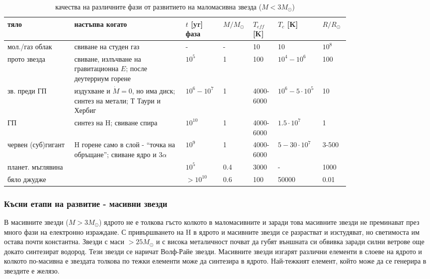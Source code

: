 \documentclass[a4paper,12pt]{article}
\begin{document}
\begin{table}[]
\begin{tabular}{p{0.18\linewidth}|p{0.30\linewidth}|p{0.08\linewidth}|p{0.06\linewidth}|p{0.06\linewidth}|p{0.06\linewidth}|p{0.06\linewidth}}
тяло               & настъпва когато                                                          & $t$ [yr]     фаза & $M/M_\odot$ & $T_{eff}$ [K]     & $T_c$ [K]           & $R/R_\odot$  \\
\hline
\hline
мол./газ облак     & свиване на студен газ                                                    & -                 & -           & 10                & 10                  & $10^8$       \\
\hline
прото звезда       & свиване, излъчване на гравитационна $E$; после деутерриум горене         & $10^5$            & 1           & 100               & $10^4-10^6$         & 100          \\
\hline
зв. преди ГП       & издухване и $\dot{M}=0$, но има диск; синтез на метали; Т Таури и Хербиг & $10^6 - 10^7$     & 1           & 4000-6000         & $10^6-5 \cdot 10^5$ & 10           \\
\hline
ГП                 & синтез на H; свиване спира                                               & $10^{10}$           & 1           & 4000-6000         & $1.5 \cdot 10^7$    & 1            \\
\hline
червен (суб)гигант & H горене само в слой - ``точка на обръщане''; свиване ядро и 3$\alpha$   & $10^9$            & 1           & 4000-6000         & $5-30 \cdot 10^7$   & 3-500        \\
\hline
планет. мъглявина  &                                                                          & $10^5$            & 0.4         & 3000              & -                   & 1000         \\
\hline
бяло джудже        &                                                                          & $>10^10$          & 0.6         & 100               & 50000               & 0.01     
\end{tabular}
\caption{качества на различните фази от развитието на маломасивна звезда ($M<3M_\odot$)} 
\end{table}

\subsubsection{Късни етапи на развитие - масивни звезди}
В масивните звезди ($M>3M_\odot$) ядрото не е толкова гъсто колкото в маломасивните и заради това масивните звезди не преминават през много фази на електронно израждане. С привършването на H в ядрото и масивните звезди се разрастват и изстудяват, но светимоста им остава почти константна. Звезди с маси $>25M_\odot$ и с висока металичност почват да губят външната си обвивка заради силни ветрове още докато синтезират водород. Тези звезди се наричат Волф-Райе звезди. Масивните звезди изгарят различни елементи в слоеве на ядрото и колкото по-масивна е звездата толкова по тежки елементи може да синтезира в ядрото. Най-тежкият елемент, който може да се генерира в звездите е желязо.\\
\end{document}

